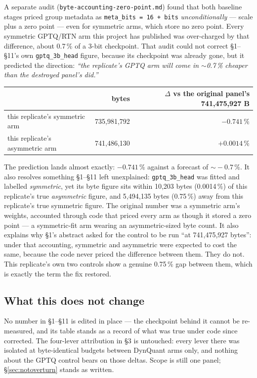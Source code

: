 \documentclass[11pt]{article}
\newcommand{\pct}{\,\%}
\newcommand{\code}[1]{\texttt{#1}}
\newcommand{\best}[1]{\textbf{#1}}
\begin{document}
A separate audit (\code{byte-accounting-zero-point.md}) found that both baseline stages priced
group metadata as \code{meta\_bits = 16 + bits} \emph{unconditionally} --- scale plus a zero
point --- even for symmetric arms, which store no zero point. Every symmetric GPTQ/RTN arm this
project has published was over-charged by that difference, about 0.7\pct{} of a 3-bit checkpoint.
That audit could not correct \S1--\S11's own \code{gptq\_3b\_head} figure, because its checkpoint
was already gone, but it predicted the direction: \emph{``the replicate's GPTQ arm will come in
$\sim$0.7\pct{} cheaper than the destroyed panel's did.''}

\begin{center}\small
\begin{tabular}{@{}lrr@{}}
\toprule
 & bytes & $\Delta$ vs the original panel's 741{,}475{,}927 B \\
\midrule
this replicate's symmetric arm & 735{,}981{,}792 & \best{$-0.741\pct{}$} \\
this replicate's asymmetric arm & 741{,}486{,}130 & $+0.0014\pct{}$ \\
\bottomrule
\end{tabular}
\end{center}

The prediction lands almost exactly: $-0.741\pct{}$ against a forecast of $\sim\!-0.7\pct{}$.
It also resolves something \S1--\S11 left unexplained: \code{gptq\_3b\_head} was fitted and
labelled \emph{symmetric}, yet its byte figure sits within 10{,}203 bytes (0.0014\pct{}) of this
replicate's true \emph{asymmetric} figure, and 5{,}494{,}135 bytes (0.75\pct{}) away from this
replicate's true symmetric figure. The original number was a symmetric arm's weights, accounted
through code that priced every arm as though it stored a zero point --- a symmetric-fit arm
wearing an asymmetric-sized byte count. It also explains why \S1's abstract asked for the control
to be run ``at 741{,}475{,}927 bytes'': under that accounting, symmetric and asymmetric were
expected to cost the same, because the code never priced the difference between them. They do
not. This replicate's own two controls show a genuine 0.75\pct{} gap between them, which is
exactly the term the fix restored.

\subsection{What this does not change}

No number in \S1--\S11 is edited in place --- the checkpoint behind it cannot be re-measured, and
its table stands as a record of what was true under code since corrected. The four-lever
attribution in \S3 is untouched: every lever there was isolated at byte-identical budgets between
DynQuant arms only, and nothing about the GPTQ control bears on those deltas. Scope is still one
panel; \S\ref{sec:notoverturn} stands as written.
\end{document}
